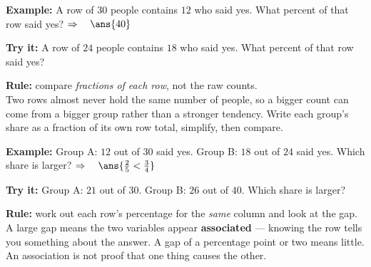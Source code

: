 \documentclass[12pt]{article}
\begin{document}
\begin{examplebox}
\textbf{Example:} \quad A row of $30$ people contains $12$ who said yes. What percent of that row
said yes?
$\Rightarrow\quad \ans{40}$
\end{examplebox}

\begin{tryitbox}
\textbf{Try it:} \quad A row of $24$ people contains $18$ who said yes. What percent of that row
said yes?\\[2pt]
\end{tryitbox}


\begin{formulabox}
\textbf{Rule:} compare \textit{fractions of each row}, not the raw counts.\\[3pt]
Two rows almost never hold the same number of people, so a bigger count can come from a bigger
group rather than a stronger tendency. Write each group's share as a fraction of its own row
total, simplify, then compare.
\end{formulabox}

\begin{examplebox}
\textbf{Example:} \quad Group A: $12$ out of $30$ said yes. Group B: $18$ out of $24$ said yes.
Which share is larger?
$\Rightarrow\quad \ans{\tfrac{2}{5} < \tfrac{3}{4}}$
\end{examplebox}

\begin{tryitbox}
\textbf{Try it:} \quad Group A: $21$ out of $30$. Group B: $26$ out of $40$. Which share is
larger?\\[2pt]
\end{tryitbox}


\begin{formulabox}
\textbf{Rule:} work out each row's percentage for the \textit{same} column and look at the gap.\\[3pt]
A large gap means the two variables appear \textbf{associated} --- knowing the row tells you
something about the answer. A gap of a percentage point or two means little. An association is
not proof that one thing causes the other.
\end{formulabox}
\end{document}
